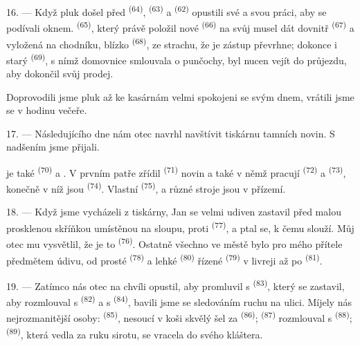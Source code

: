 16. --- Když pluk došel před  \textsuperscript{(64)},
 \textsuperscript{(63)} a  \textsuperscript{(62)}
opustili své  a svou práci, aby se podívali oknem.
 \textsuperscript{(65)}, který právě položil nové 
\textsuperscript{(66)} na svůj  musel dát dovnitř 
\textsuperscript{(67)} a  vyložená na chodníku, blízko
 \textsuperscript{(68)}, ze strachu, že je zástup převrhne;
dokonce i starý  \textsuperscript{(69)}, s nímž domovnice smlouvala
o punčochy, byl nucen vejít do průjezdu, aby dokončil svůj prodej.

Doprovodili jsme pluk až ke kasárnám  velmi spokojeni se svým dnem, vrátili jsme se
v hodinu večeře.

\VUsaut{3.0mm}

17. --- Následujícího dne nám otec navrhl navštívit tiskárnu tamních novin. S nadšením jsme
přijali.

 je také  \textsuperscript{(70)}    a . V prvním patře zřídil
 \textsuperscript{(71)} novin a také  v němž
pracují  \textsuperscript{(72)} a 
\textsuperscript{(73)}, konečně  v níž jsou 
\textsuperscript{(74)}. Vlastní  \textsuperscript{(75)},
 a různé stroje jsou v přízemí.

\VUsaut{3.0mm}

18. --- Když jsme vycházeli z tiskárny, Jan se velmi udiven zastavil před malou prosklenou
skříňkou umístěnou na sloupu, proti  \textsuperscript{(77)}, a
ptal se, k čemu slouží. Můj otec mu vysvětlil, že je to
 \textsuperscript{(76)}. Ostatně všechno ve městě bylo pro mého
přítele předmětem údivu, od prosté  \textsuperscript{(78)} a lehké
 \textsuperscript{(80)} řízené 
\textsuperscript{(79)} v livreji až po  \textsuperscript{(81)}.

19. --- Zatímco nás otec na chvíli opustil, aby promluvil s 
\textsuperscript{(83)}, který se zastavil, aby rozmlouval s 
\textsuperscript{(82)} a s  \textsuperscript{(84)}, bavili jsme se sledováním
ruchu na ulici. Míjely nás nejrozmanitější osoby: 
\textsuperscript{(85)}, nesoucí v koši skvělý  šel za
 \textsuperscript{(86)};  \textsuperscript{(87)}
rozmlouval s  \textsuperscript{(88)};
 \textsuperscript{(89)}, která vedla za ruku sirotu, se vracela do
svého kláštera.

